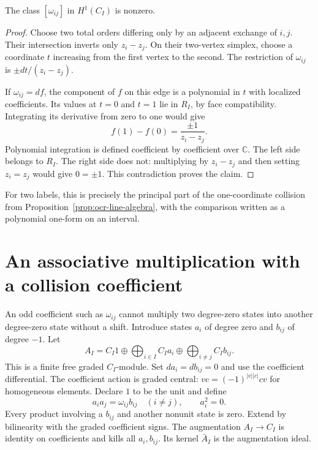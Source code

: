 \begin{proposition}\label{prop:ocb-nonzero-coefficient}
The class $[\omega_{ij}]$ in $H^1(C_I)$ is nonzero.
\end{proposition}

\begin{proof}
Choose two total orders differing only by an adjacent exchange
of $i,j$. Their intersection inverts only $z_i-z_j$.
On their two-vertex simplex, choose a coordinate $t$ increasing
from the first vertex to the second.
The restriction of $\omega_{ij}$ is
$\pm dt/(z_i-z_j)$.

If $\omega_{ij}=df$, the component of $f$ on this edge is a
polynomial in $t$ with localized coefficients.
Its values at $t=0$ and $t=1$ lie in $R_I$, by face compatibility.
Integrating its derivative from zero to one would give
\[
 f(1)-f(0)=\frac{\pm1}{z_i-z_j}.
\]
Polynomial integration is defined coefficient by coefficient over
$\mathbb C$.
The left side belongs to $R_I$.
The right side does not: multiplying by $z_i-z_j$ and then setting
$z_i=z_j$ would give $0=\pm1$.
This contradiction proves the claim.
\end{proof}

For two labels, this is precisely the principal part of the
one-coordinate collision from
Proposition~\ref{prop:ocr-line-algebra}, with the comparison written
as a polynomial one-form on an interval.

\section{An associative multiplication with a collision coefficient}

An odd coefficient such as $\omega_{ij}$ cannot multiply two
degree-zero states into another degree-zero state without a shift.
Introduce states $a_i$ of degree zero and $b_{ij}$ of degree $-1$.
Let
\[
 A_I=C_I1\oplus\bigoplus_{i\in I}C_Ia_i
           \oplus\bigoplus_{i\ne j}C_Ib_{ij}.
\]
This is a finite free graded $C_I$-module.
Set $da_i=db_{ij}=0$ and use the coefficient differential.
The coefficient action is graded central:
$vc=(-1)^{|v||c|}cv$ for homogeneous elements.
Declare $1$ to be the unit and define
\begin{equation}\label{eq:ocb-multiplication}
 a_i a_j=\omega_{ij}b_{ij}\quad(i\ne j),
 \qquad a_i^2=0.
\end{equation}
Every product involving a $b_{ij}$ and another nonunit state is zero.
Extend by bilinearity with the graded coefficient signs.
The augmentation $A_I\to C_I$ is identity on coefficients and kills
all $a_i,b_{ij}$.
Its kernel $\bar A_I$ is the augmentation ideal.

